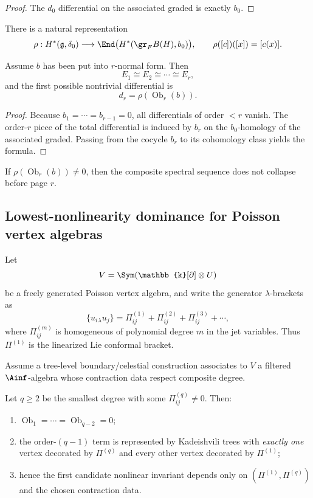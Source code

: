 \begin{proof}
The $d_0$ differential on the associated graded is exactly $b_0$.
\end{proof}

There is a natural representation
\[
\rho:H^\ast(\mathfrak g,\delta_0)\longrightarrow
\End\big(H^\ast(\gr_FB(H),b_0)\big),
\qquad
\rho([c])([x])=[c(x)].
\]

\begin{theorem}
Assume $b$ has been put into $r$-normal form. Then
\[
E_1\cong E_2\cong\cdots\cong E_r,
\]
and the first possible nontrivial differential is
\[
d_r=\rho(\operatorname{Ob}_r(b)).
\]
\end{theorem}

\begin{proof}
Because $b_1=\cdots=b_{r-1}=0$, all differentials of order $<r$ vanish. The order-$r$ piece of the total differential is induced by $b_r$ on the $b_0$-homology of the associated graded. Passing from the cocycle $b_r$ to its cohomology class yields the formula.
\end{proof}

\begin{corollary}
If $\rho(\operatorname{Ob}_r(b))\neq0$, then the composite spectral sequence does not collapse before page $r$.
\end{corollary}

\subsection{Lowest-nonlinearity dominance for Poisson vertex algebras}

Let
\[
V=\Sym(\mathbb{k}[\partial]\otimes U)
\]
be a freely generated Poisson vertex algebra, and write the generator $\lambda$-brackets as
\[
\{u_i{}_\lambda u_j\}
=
\Pi^{(1)}_{ij}
+\Pi^{(2)}_{ij}
+\Pi^{(3)}_{ij}
+\cdots,
\]
where $\Pi^{(m)}_{ij}$ is homogeneous of polynomial degree $m$ in the jet variables. Thus $\Pi^{(1)}$ is the linearized Lie conformal bracket.

Assume a tree-level boundary/celestial construction associates to $V$ a filtered $\Ainf$-algebra whose contraction data respect composite degree.

\begin{theorem}
Let $q\ge2$ be the smallest degree with some $\Pi^{(q)}_{ij}\neq0$. Then:
\begin{enumerate}[label=\textup{(\roman*)},leftmargin=2em]
\item $\operatorname{Ob}_1=\cdots=\operatorname{Ob}_{q-2}=0$;
\item the order-$(q-1)$ term is represented by Kadeishvili trees with \emph{exactly one} vertex decorated by $\Pi^{(q)}$ and every other vertex decorated by $\Pi^{(1)}$;
\item hence the first candidate nonlinear invariant depends only on $(\Pi^{(1)},\Pi^{(q)})$ and the chosen contraction data.
\end{enumerate}
\end{theorem}

